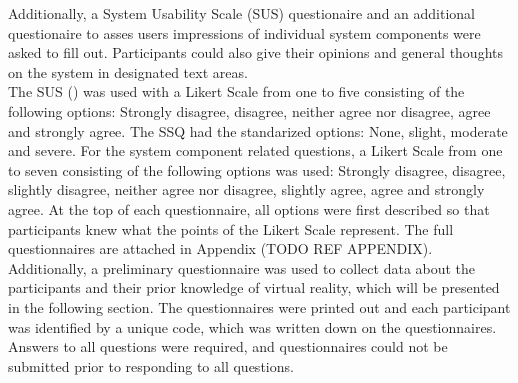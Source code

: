 Additionally, a System Usability Scale (SUS) \cite{brooke1996sus} questionaire and an additional questionaire to asses users impressions of individual system components were asked to fill out.
Participants could also give their opinions and general thoughts on the system in designated text areas.
\\ The SUS (\cite{brooke1996sus}) was used with a Likert Scale from one to five consisting of the following options: Strongly disagree, disagree, neither agree nor disagree, agree and strongly agree.
The SSQ had the standarized options: None, slight, moderate and severe.
For the system component related questions, a Likert Scale from one to seven consisting of the following options was used: Strongly disagree, disagree, slightly disagree, neither agree nor disagree, 
slightly agree, agree and strongly agree.
At the top of each questionnaire, all options were first described so that participants knew what the points of the Likert Scale represent.
The full questionnaires are attached in Appendix (TODO REF APPENDIX).
Additionally, a preliminary questionnaire was used to collect data about the participants and their prior knowledge of virtual reality, which will be presented in the following section.
The questionnaires were printed out and each participant was identified by a unique code, which was written down on the questionnaires.
Answers to all questions were required, and questionnaires could not be submitted prior to responding to all questions.